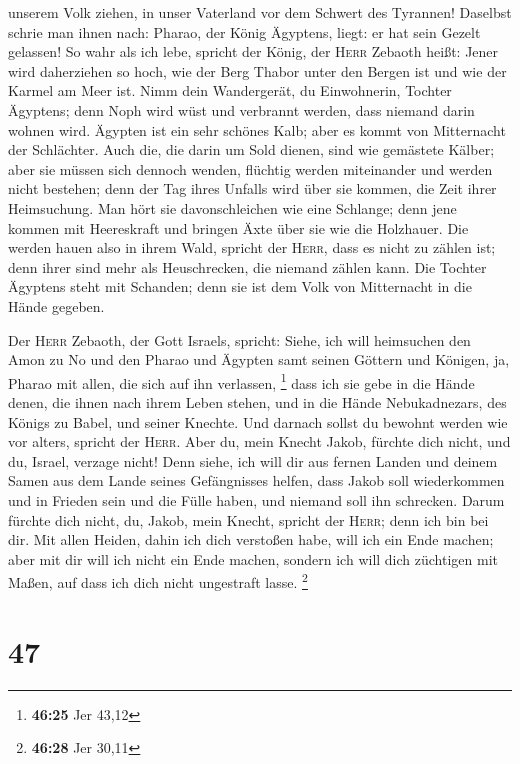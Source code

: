 unserem Volk ziehen, in unser Vaterland vor dem Schwert des Tyrannen!
 Daselbst schrie man ihnen nach: Pharao, der König
Ägyptens, liegt: er hat sein Gezelt gelassen!  So wahr
als ich lebe, spricht der König, der \textsc{Herr} Zebaoth heißt: Jener
wird daherziehen so hoch, wie der Berg Thabor unter den Bergen ist und
wie der Karmel am Meer ist.  Nimm dein Wandergerät, du
Einwohnerin, Tochter Ägyptens; denn Noph wird wüst und verbrannt werden,
dass niemand darin wohnen wird.  Ägypten ist ein sehr
schönes Kalb; aber es kommt von Mitternacht der Schlächter.
 Auch die, die darin um Sold dienen, sind wie gemästete
Kälber; aber sie müssen sich dennoch wenden, flüchtig werden miteinander
und werden nicht bestehen; denn der Tag ihres Unfalls wird über sie
kommen, die Zeit ihrer Heimsuchung.  Man hört sie
davonschleichen wie eine Schlange; denn jene kommen mit Heereskraft und
bringen Äxte über sie wie die Holzhauer.  Die werden
hauen also in ihrem Wald, spricht der \textsc{Herr}, dass es nicht zu
zählen ist; denn ihrer sind mehr als Heuschrecken, die niemand zählen
kann.  Die Tochter Ägyptens steht mit Schanden; denn sie
ist dem Volk von Mitternacht in die Hände gegeben.

 Der \textsc{Herr} Zebaoth, der Gott Israels, spricht:
Siehe, ich will heimsuchen den Amon zu No und den Pharao und Ägypten
samt seinen Göttern und Königen, ja, Pharao mit allen, die sich auf ihn
verlassen, \footnote{\textbf{46:25} Jer 43,12}  dass ich
sie gebe in die Hände denen, die ihnen nach ihrem Leben stehen, und in
die Hände Nebukadnezars, des Königs zu Babel, und seiner Knechte. Und
darnach sollst du bewohnt werden wie vor alters, spricht der
\textsc{Herr}.  Aber du, mein Knecht Jakob, fürchte dich
nicht, und du, Israel, verzage nicht! Denn siehe, ich will dir aus
fernen Landen und deinem Samen aus dem Lande seines Gefängnisses helfen,
dass Jakob soll wiederkommen und in Frieden sein und die Fülle haben,
und niemand soll ihn schrecken.  Darum fürchte dich
nicht, du, Jakob, mein Knecht, spricht der \textsc{Herr}; denn ich bin
bei dir. Mit allen Heiden, dahin ich dich verstoßen habe, will ich ein
Ende machen; aber mit dir will ich nicht ein Ende machen, sondern ich
will dich züchtigen mit Maßen, auf dass ich dich nicht ungestraft lasse.
\footnote{\textbf{46:28} Jer 30,11}

\hypertarget{section-12}{%
\section{47}\label{section-12}}

